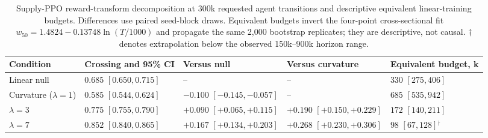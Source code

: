 \begin{table}[t]
\caption{Supply-PPO reward-transform decomposition at 300k requested agent transitions and descriptive equivalent linear-training budgets. Differences use paired seed-block draws. Equivalent budgets invert the four-point cross-sectional fit $w_{50}=1.4824-0.13748\ln(T/1000)$ and propagate the same 2,000 bootstrap replicates; they are descriptive, not causal. $\dagger$ denotes extrapolation below the observed 150k--900k horizon range.}
\label{tab:decomposition}
\centering\small
{\setlength{\tabcolsep}{4pt}
\begin{tabular}{@{}lllll@{}}
\toprule
Condition & Crossing and 95\% CI & Versus null & Versus curvature & Equivalent budget, k \\
\midrule
Linear null & $0.685$ $[0.650,0.715]$ & -- & -- & $330$ $[275,406]$ \\
Curvature ($\lambda=1$) & $0.585$ $[0.544,0.624]$ & $-0.100$ $[-0.145,-0.057]$ & -- & $685$ $[535,942]$ \\
$\lambda=3$ & $0.775$ $[0.755,0.790]$ & $+0.090$ $[+0.065,+0.115]$ & $+0.190$ $[+0.150,+0.229]$ & $172$ $[140,211]$ \\
$\lambda=7$ & $0.852$ $[0.840,0.865]$ & $+0.167$ $[+0.134,+0.203]$ & $+0.268$ $[+0.230,+0.306]$ & $98$ $[67,128]$$^{\dagger}$ \\
\bottomrule
\end{tabular}
}
\end{table}
